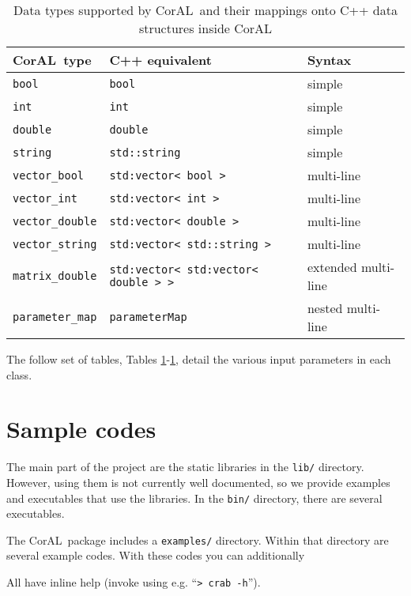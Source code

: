 \documentclass[10pt]{article}
\newcommand{\coral}{CorAL}
\begin{document}
\begin{table}
	\begin{tabular}{lll}
		\hline\hline
		\coral\ type 	& C++ equivalent & Syntax \\ \hline \hline
		{\tt bool}		& {\tt bool} & simple \\
		{\tt int}		& {\tt int} & simple \\
		{\tt double} 	& {\tt double} & simple  \\
		{\tt string}		& {\tt std::string} & simple \\
		{\tt vector\_bool}	& {\tt std:vector< bool > } & multi-line \\
		{\tt vector\_int}		& {\tt std:vector< int > } & multi-line \\
		{\tt vector\_double}	& {\tt std:vector< double > } & multi-line \\
		{\tt vector\_string}	& {\tt std:vector< std::string > }  & multi-line\\
		{\tt matrix\_double} 	& {\tt std:vector< std:vector< double > > }  & extended  multi-line\\
		{\tt parameter\_map}& {\tt parameterMap}& nested multi-line\\\hline
	\end{tabular}
	\caption{\label{table:types}Data types supported by \coral \  and their mappings onto C++ data structures inside \coral}
\end{table}


The follow set of tables, Tables \ref{}-\ref{}, detail the various input parameters in each class.

\section{Sample codes}
The main part of the project are the static libraries in the {\tt lib/} directory.  
However, using them is not currently well documented, so we provide examples and 
executables that use the libraries.  In the {\tt bin/} directory, there are several 
executables.

The \coral\ package includes a {\tt examples/} directory. Within that directory are several example codes. With these codes you can additionally 

All have inline help (invoke using e.g. ``{\tt > crab -h}'').
\end{document}
